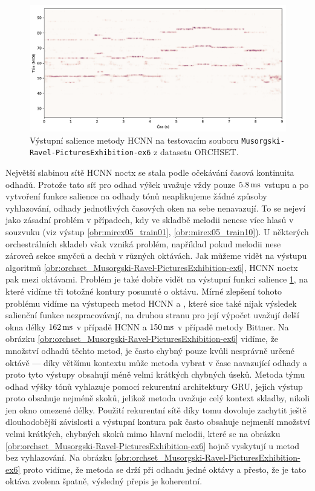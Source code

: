 \begin{figure}[h]\centering
\includegraphics[scale=0.4]{../img/vysledky/orchset_Musorgski-Ravel-PicturesExhibition-ex6_salience}
\caption{Výstupní salience metody HCNN na testovacím souboru \texttt{Musorgski-Ravel-PicturesExhibition-ex6} z datasetu ORCHSET.}
\label{obr:orchset_Musorgski-Ravel-PicturesExhibition-ex6_salience}
\end{figure}

Největší slabinou sítě HCNN noctx se stala podle očekávání časová kontinuita odhadů. Protože tato síť pro odhad výšek uvažuje vždy pouze $5.8\,\rm ms$ vstupu a po vytvoření funkce salience na odhady tónů neaplikujeme žádné způsoby vyhlazování, odhady jednotlivých časových oken na sebe nenavazují. To se nejeví jako zásadní problém v případech, kdy ve skladbě melodii nenese více hlasů v souzvuku (viz výstup \ref{obr:mirex05_train01}, \ref{obr:mirex05_train10}). U některých orchestrálních skladeb však vzniká problém, například pokud melodii nese zároveň sekce smyčců a dechů v různých oktávách. Jak můžeme vidět na výstupu algoritmů \ref{obr:orchset_Musorgski-Ravel-PicturesExhibition-ex6}, HCNN noctx pak  mezi oktávami. Problém je také dobře vidět na výstupní funkci salience \ref{obr:orchset_Musorgski-Ravel-PicturesExhibition-ex6_salience}, na které vidíme tři totožné kontury posunuté o oktávu. Mírné zlepšení tohoto problému vidíme na výstupech metod HCNN a \cite{Bittner2017}, které sice také nijak výsledek salienční funkce nezpracovávají, na druhou stranu pro její výpočet uvažují delší okna délky $162\,\rm ms$ v případě HCNN a $150\,\rm ms$ v případě metody Bittner. Na obrázku \ref{obr:orchset_Musorgski-Ravel-PicturesExhibition-ex6} vidíme, že množství odhadů těchto metod, je často chybný pouze kvůli nesprávně určené oktávě --- díky většímu kontextu může metoda vybrat v čase navazující odhady a proto tyto výstupy obsahují méně velmi krátkých chybných úseků. Metoda týmu \cite{DBasaranSEssid2018} odhad výšky tónů vyhlazuje pomocí rekurentní architektury GRU, jejich výstup proto obsahuje nejméně skoků, jelikož metoda uvažuje celý kontext skladby, nikoli jen okno omezené délky. Použití rekurentní sítě díky tomu dovoluje zachytit ještě dlouhodobější závislosti a výstupní kontura pak často obsahuje nejmenší množství velmi krátkých, chybných skoků mimo hlavní melodii, které se na obrázku \ref{obr:orchset_Musorgski-Ravel-PicturesExhibition-ex6} hojně vyskytují u metod bez vyhlazování. Na obrázku \ref{obr:orchset_Musorgski-Ravel-PicturesExhibition-ex6} proto vidíme, že metoda \cite{DBasaranSEssid2018} se drží při odhadu jedné oktávy a přesto, že je tato oktáva zvolena špatně, výsledný přepis je koherentní.

